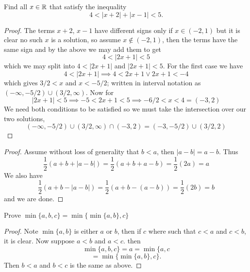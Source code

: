 \question 
Find all $x \in \mathbb{R}$ that satisfy the inequality 
\[ 4 < |x + 2| + |x - 1| < 5. \] 


\begin{proof}
    The terms $x + 2$, $x - 1$ have different signs only if $x \in (-2, 1)$ but it is clear 
    no such $x$ is a solution, so assume $x \notin (-2, 1)$, then the terms have the same sign and by the above we may add them 
    to get 
    \[4 < |2x +1 | < 5\]
    which we may split into $4 < |2x + 1| $ and $|2x + 1| < 5$. 
    For the first case we have 
    \[4 < |2x + 1| \implies 4 < 2x + 1 \vee 2x + 1 < -4\]
    which gives $3/2 < x$ and $x < -5/2$; written in interval notation as $(-\infty, -5/2) \cup (3/2, \infty)$. 
    Now for 
    \[|2x + 1| < 5 \implies -5 < 2x + 1 < 5 \implies -6/2 < x < 4 = (-3, 2)\]
    We need both conditions to be satisfied so we must take the intersection over our two solutions, 
    \[(-\infty, -5/2) \cup (3/2, \infty) \cap (-3, 2) = (-3, -5/2) \cup (3/2, 2)\]
\end{proof}

\question  
\begin{alphaparts}
\questionpart

\begin{proof}
    Assume without loss of generality that $b < a$, then $|a - b| = a - b$. 
    Thus 
    \[\frac{1}{2}(a + b + |a - b|) = \frac{1}{2}(a + b + a -b ) = \frac{1}{2}(2a) = a\]
    We also have 
    \[\frac{1}{2}(a + b - |a - b|) = \frac{1}{2}(a + b -(a - b)) = \frac{1}{2}(2b) = b\]
    and we are done.  
\end{proof}

\questionpart 
Prove $\min\{a, b, c\} = \min\{\min\{a, b\}, c\}$

\begin{proof}
    Note $\min\{a, b\}$ is either $a$ or $b$, then if $c$ where such that $c < a$ and $c < b$, it is clear. Now suppose $a < b$ and $a < c$. then 
\[ \min\{a, b, c\} = a = \min\{a, c \] 
\[ = \min\{\min\{a, b\}, c\}.\]
Then $b < a$ and $b < c$ is the same as above.

\end{proof}


\end{alphaparts}


\question 

